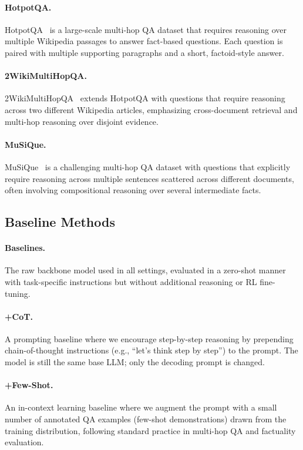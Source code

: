 \documentclass[10pt, a4paper, logo]{googledeepmind} %
\begin{document}
\paragraph{HotpotQA.}
HotpotQA~\citep{yang2018hotpotqa} is a large-scale multi-hop QA dataset that requires reasoning over multiple Wikipedia passages to answer fact-based questions. Each question is paired with multiple supporting paragraphs and a short, factoid-style answer.

\paragraph{2WikiMultiHopQA.}
2WikiMultiHopQA~\citep{ho2020constructing} extends HotpotQA with questions that require reasoning across two different Wikipedia articles, emphasizing cross-document retrieval and multi-hop reasoning over disjoint evidence.

\paragraph{MuSiQue.}
MuSiQue~\citep{trivedi2022musique} is a challenging multi-hop QA dataset with questions that explicitly require reasoning across multiple sentences scattered across different documents, often involving compositional reasoning over several intermediate facts.


\subsection{Baseline Methods}
\label{app:baselines}

\paragraph{Baselines.}
The raw backbone model used in all settings, evaluated in a zero-shot manner with task-specific instructions but without additional reasoning or RL fine-tuning. 

\paragraph{+CoT.}
A prompting baseline where we encourage step-by-step reasoning by prepending chain-of-thought instructions (e.g., ``let's think step by step'') to the prompt. The model is still the same base LLM; only the decoding prompt is changed.

\paragraph{+Few-Shot.}
An in-context learning baseline where we augment the prompt with a small number of annotated QA examples (few-shot demonstrations) drawn from the training distribution, following standard practice in multi-hop QA and factuality evaluation.
\end{document}
